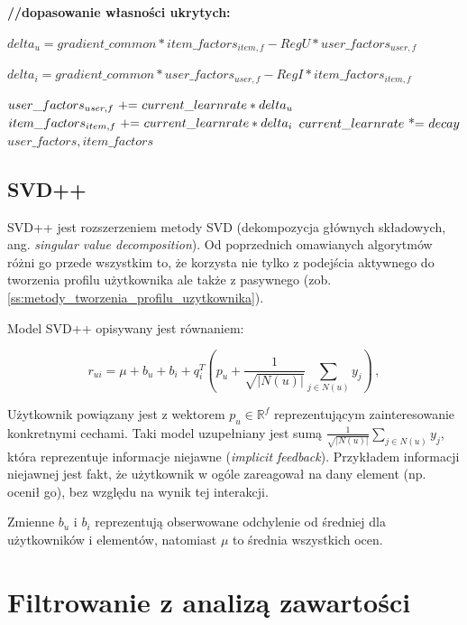 \documentclass[twoside]{iisthesis}
\begin{document}
\begin{algorithm}[H]
\begin{algorithmic}
				 		\textbf{//dopasowanie własności ukrytych:}
				 		
					 		\STATE $delta_u = gradient\_common * item\_factors_{item, f} - RegU * user\_factors_{user, f}$
					 		
					 		\STATE $delta_i = gradient\_common * user\_factors_{user, f} - RegI * item\_factors_{item, f}$
					 		
					 		\STATE $user\_factors_{user, f} \incr current\_learnrate * delta_u$
					 		\STATE $item\_factors_{item, f} \incr current\_learnrate * delta_i$
				 		\ENDFOR					
			 		\ENDFOR			
			 		\STATE $current\_learnrate \incrtimes decay$				
		 		\ENDFOR
		 		\RETURN $user\_factors, item\_factors$
		 	\end{algorithmic}
		 \end{algorithm}
		 		 
		 \subsection{SVD++}
		 
		 SVD++ jest rozszerzeniem metody SVD (dekompozycja głównych składowych, ang. \textit{singular value decomposition}). Od poprzednich omawianych algorytmów różni go przede wszystkim to, że korzysta nie tylko z podejścia aktywnego do tworzenia profilu użytkownika ale także z pasywnego (zob. \ref{ss:metody_tworzenia_profilu_uzytkownika}).
		 
		 Model SVD++ opisywany jest równaniem:
		 
		 \begin{equation}
		 	\label{eq:svd}
		 	r_{ui} = \mu + b_u + b_i + q_i^T (p_u + \frac{1}{\sqrt{|N(u)|}} \sum_{j \in N(u)}^{} y_j) 
		 	\,,
		 \end{equation}
		 		 
		 Użytkownik powiązany jest z wektorem $p_u \in \mathbb{R} ^f$ reprezentującym zainteresowanie konkretnymi cechami. Taki model uzupełniany jest sumą  $\frac{1}{\sqrt{|N(u)|}} \sum_{j \in N(u)}^{} y_j$, która reprezentuje informacje niejawne (\textit{implicit feedback}). Przykładem informacji niejawnej jest fakt, że użytkownik w ogóle zareagował na dany element (np. ocenił go), bez względu na wynik tej interakcji. 
		  
		 Zmienne $b_u$ i $b_i$ reprezentują obserwowane odchylenie od średniej dla użytkowników i elementów, natomiast $\mu$ to średnia wszystkich ocen\cite{koren2008factorization}. 
		 	 
		 
	 \section{Filtrowanie z analizą zawartości}
	 
\end{document}

